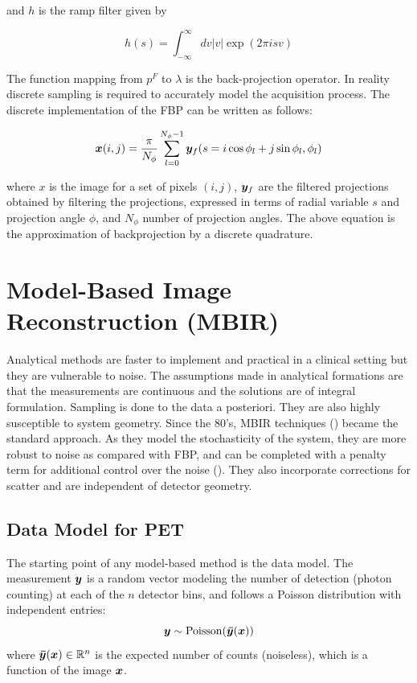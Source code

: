 and $h$ is the ramp filter given by

\begin{equation}
h(s)=\int_{-\infty}^{\infty} d v|v| \exp (2 \pi i s v)
\end{equation}



The function mapping from $p^{F}$ to $\lambda$ is the back-projection operator. 
In reality discrete sampling is required to accurately model the acquisition process. The discrete implementation of the \ac{FBP} can be written as follows:

\begin{equation}\label{eq:FBP}
\bm{x}(i,j) = \frac{\pi}{N_\phi}\sum_{l=0}^{N_\phi-1}\bm{y}_f(s=i\cos\phi_l+j\sin\phi_l,\phi_l)
\end{equation}

where $x$ is the image for a set of pixels $(i,j)$, $\bm{y}_f$ are the filtered projections obtained by filtering the projections, expressed in terms of radial variable $s$ and projection angle $\phi$, and $N_\phi$ number of projection angles. The above equation is the approximation of backprojection by a discrete quadrature. 




\section{Model-Based Image Reconstruction (MBIR)}

Analytical methods are faster to implement and practical in a clinical setting but they are vulnerable to noise. The assumptions made in analytical formations are that the measurements are continuous and the solutions are of integral formulation. Sampling is done to the data a posteriori. They are also highly susceptible to system geometry. Since the 80's, \ac{MBIR} techniques (\cite{Shepp1982,fessler2000statistical}) became the standard approach. As they model the stochasticity of the system, they are more robust to noise as compared with \ac{FBP}, and can be completed with a penalty term for additional control over the noise (\cite{depierro1995}). They also incorporate corrections for scatter and are independent of detector geometry.

\subsection{Data Model for PET}
The starting point of any model-based method is the data model. The measurement $\bm{y}$ is a random vector modeling the number of detection (photon counting) at each of the $n$ detector bins, and follows a Poisson distribution with independent entries:
\begin{equation}\label{eq:poisson}
\bm{y} \sim \mathrm{Poisson}(\bm{\bar{y}}(\bm{x}))
\end{equation}    
where $\bm{\bar{y}}(\bm{x}) \in \mathbb{R}^n$ is the expected number of counts (noiseless), which is a function of the image $\bm{x}$. 

